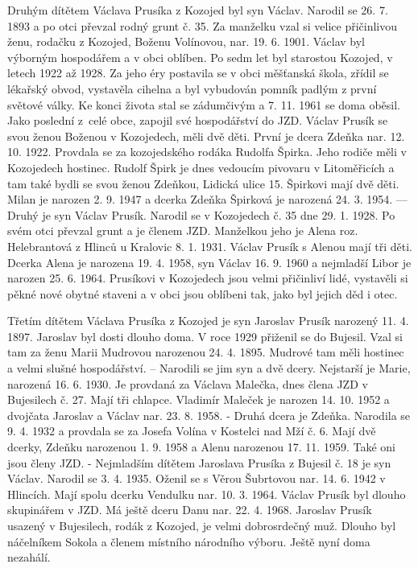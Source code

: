 \documentclass[../dejiny-rodu-prusiku.tex]{subfiles}
\begin{document}
Druhým dítětem Václava Prusíka z Kozojed byl syn Václav. Narodil se 26. 7. 1893 a po otci převzal rodný grunt č. 35. Za manželku vzal si velice přičinlivou ženu, rodačku z Kozojed, Boženu Volínovou, nar. 19. 6. 1901. Václav byl výborným hospodářem a v obci oblíben. Po sedm let byl starostou Kozojed, v letech 1922 až 1928. Za jeho éry postavila se v obci měšťanská škola, zřídil se lékařský obvod, vystavěla cihelna a byl vybudován pomník padlým z první světové války. Ke konci života stal se zádumči­vým a 7. 11. 1961 se doma oběsil. Jako poslední z celé obce, zapojil své hospodářství do JZD. Václav Prusík se svou ženou Boženou v Kozojedech, měli dvě děti. První je dcera Zdeňka nar. 12. 10. 1922. Provdala se za kozojedského rodáka Rudolfa Špirka. Jeho rodiče měli v Kozojedech hostinec. Rudolf Špirk je dnes vedoucím pivova­ru v Litoměřicích a tam také bydli se svou ženou Zdeňkou, Lidická ulice 15. Špirkovi mají dvě děti. Milan je narozen 2. 9. 1947 a dcerka Zdeňka Špirková je narozená 24. 3. 1954. — Druhý je syn Václav Prusík. Narodil se v Kozojedech č. 35 dne 29. 1. 1928. Po svém otci převzal grunt  a je členem JZD. Manželkou jeho je Alena roz. Helebrantová z Hlinců u Kralovic 8. 1. 1931. Václav Prusík s Alenou mají tři děti. Dcerka Alena je narozena 19. 4. 1958, syn Václav 16. 9. 1960 a nejmladší Libor je narozen 25. 6. 1964. Prusíkovi v Kozojedech jsou velmi přičinliví lidé, vystavěli si pěkné nové obytné staveni a v obci jsou oblíbeni tak, jako byl jejich děd i otec.

Třetím dítětem Václava Prusíka z Kozojed je syn Jaroslav Prusík narozený 11. 4. 1897. Jaroslav byl dosti dlouho doma.  V roce 1929 přiženil se do Bujesil. Vzal si tam za
ženu Marii Mudrovou narozenou 24. 4. 1895. Mudrové tam měli hostinec a velmi slušné hospodářství. – Narodili se jim syn a dvě dcery. Nejstarší je Marie, narozená 16. 6. 1930. Je provdaná za Václava Malečka, dnes člena JZD v Bujesilech č. 27. Mají tři chlapce. Vladi­mír Maleček je narozen 14. 10. 1952 a dvojčata Jaroslav a Václav nar. 23. 8. 1958. - Druhá dcera je Zdeňka. Narodila se 9. 4. 1932 a provdala se za Josefa Volína v Kostelci nad Mží č. 6. Mají dvě dcerky, Zdeňku narozenou 1. 9. 1958 a Alenu narozenou 17. 11. 1959. Také oni jsou členy JZD. - Nejmladším dítětem Jaroslava Prusíka z Bujesil č. 18 je syn Václav. Narodil se 3. 4. 1935. Oženil se s Věrou Šubrtovou nar. 14. 6. 1942 v Hlincích. Mají spolu dcerku Vendulku nar. 10. 3. 1964. Václav Prusík byl dlouho skupinářem v JZD. Má ještě dceru Danu nar. 22. 4. 1968. Jaroslav Prusík usazený v Bujesilech, rodák z Kozojed, je velmi dobrosrdečný muž. Dlouho byl náčelníkem Sokola a členem místního národního výboru. Ještě nyní doma nezahálí.
\end{document}
